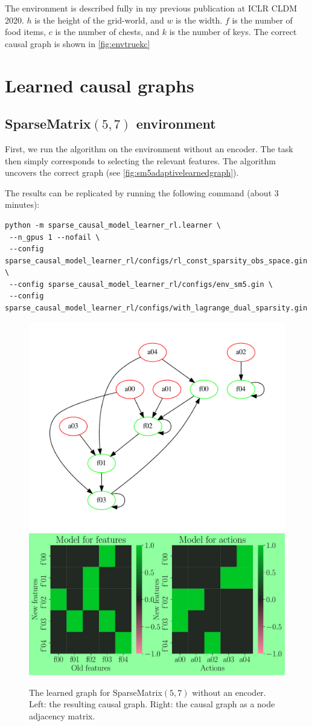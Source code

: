 \documentclass[a4paper,11pt,oneside]{report}
\begin{document}
The environment is described fully in my previous publication \cite{Volodin2020} at ICLR CLDM 2020. $h$ is the height of the grid-world, and $w$ is the width. $f$ is the number of food items, $c$ is the number of chests, and $k$ is the number of keys. The correct causal graph is shown in \autoref{fig:envtruekc}

\section{Learned causal graphs}
\subsection{SparseMatrix$(5, 7)$ environment}
First, we run the algorithm on the environment without an encoder. The task then simply corresponds to selecting the relevant features. The algorithm uncovers the correct graph (see \autoref{fig:sm5adaptivelearnedgraph}).

The results can be replicated by running the following command (about $3$ minutes):
\begin{verbatim}
python -m sparse_causal_model_learner_rl.learner \
 --n_gpus 1 --nofail \
 --config sparse_causal_model_learner_rl/configs/rl_const_sparsity_obs_space.gin \
 --config sparse_causal_model_learner_rl/configs/env_sm5.gin \
 --config sparse_causal_model_learner_rl/configs/with_lagrange_dual_sparsity.gin
\end{verbatim}

\begin{figure}
    \centering
    \includegraphics[width=0.6\linewidth]{plots/sm5_noenc_graph}
    \includegraphics[width=0.39\linewidth]{plots/sm5_learned_graph_matrix}
    \caption{The learned graph for SparseMatrix$(5, 7)$ without an encoder. Left: the resulting causal graph. Right: the causal graph as a node adjacency matrix.}
    \label{fig:sm5adaptivelearnedgraph}
\end{figure}
\end{document}

